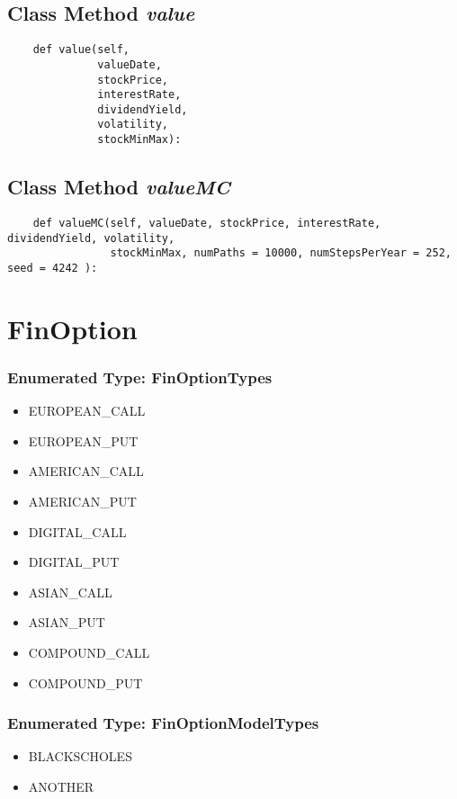 \documentclass[twoside,11pt]{book}
\begin{document}
\subsection{Class Method {\it value}}


\begin{lstlisting}
    def value(self,
              valueDate,
              stockPrice,
              interestRate,
              dividendYield,
              volatility, 
              stockMinMax):
\end{lstlisting}

\subsection{Class Method {\it valueMC}}


\begin{lstlisting}
    def valueMC(self, valueDate, stockPrice, interestRate, dividendYield, volatility, 
                stockMinMax, numPaths = 10000, numStepsPerYear = 252, seed = 4242 ):
\end{lstlisting}

\newpage
\section{FinOption}

\subsubsection{Enumerated Type: FinOptionTypes}
\begin{itemize}
\item{EUROPEAN\_CALL}
\item{EUROPEAN\_PUT}
\item{AMERICAN\_CALL}
\item{AMERICAN\_PUT}
\item{DIGITAL\_CALL}
\item{DIGITAL\_PUT}
\item{ASIAN\_CALL}
\item{ASIAN\_PUT}
\item{COMPOUND\_CALL}
\item{COMPOUND\_PUT}
\end{itemize}

\subsubsection{Enumerated Type: FinOptionModelTypes}
\begin{itemize}
\item{BLACKSCHOLES}
\item{ANOTHER}
\end{itemize}
\end{document}
